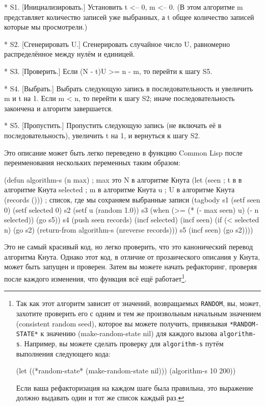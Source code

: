 \begin{myverb}
 * S1. [Инициализировать.] Установить t <-- 0, m <-- 0. (В этом алгоритме m 
представляет количество записей уже выбранных, а t общее количество 
записей которые мы просмотрели.)

 * S2. [Сгенерировать U.] Сгенерировать случайное число U, равномерно 
распределённое между нулём и единицей.

 * S3. [Проверить.] Если (N - t)U >= n - m, то перейти к шагу S5.

 * S4. [Выбрать.] Выбрать следующую запись в последовательность и увеличить
m и t на 1. Если m < n, то перейти к шагу S2; иначе 
последовательность закончена и алгоритм завершается.

 * S5. [Пропустить.] Пропустить следующую запись (не включать её в 
последовательность), увеличить t на 1, и вернуться к шагу S2.
\end{myverb}

Это описание может быть легко переведено в  функцию Common Lisp после переименования
нескольких переменных таким образом:

\begin{myverb}
(defun algorithm-s (n max) ; max это N в алгоритме Кнута
  (let (seen               ; t в в алгоритме Кнута
        selected           ; m в алгоритме Кнута
        u                  ; U в алгоритме Кнута
        (records ()))      ; список, где мы сохраняем выбранные записи
    (tagbody
     s1
       (setf seen 0)
       (setf selected 0)
     s2
       (setf u (random 1.0))
     s3
       (when (>= (* (- max seen) u) (- n selected)) (go s5))
     s4
       (push seen records)
       (incf selected)
       (incf seen)
       (if (< selected n)
           (go s2)
           (return-from algorithm-s (nreverse records)))
     s5
       (incf seen)
       (go s2))))
\end{myverb}

Это не самый красивый код, но легко проверить, что это канонический перевод алгоритма
Кнута. Однако этот код, в отличие от прозаического описания у Кнута, может быть запущен и
проверен. Затем вы можете начать рефакторинг, проверяя после каждого изменения, что
функция всё ещё работает\footnote{Так как этот алгоритм зависит от значений, возвращаемых
  \lstinline{RANDOM}, вы, может, захотите проверить его с одним и тем же произвольным
  начальным значением (consistent random seed), которое вы можете получить, привязывая
  \lstinline{*RANDOM-STATE*} к значению (make-random-state nil) для каждого вызова
  \lstinline{algorithm-s}. Например, вы можете сделать проверку для
  \lstinline{algorithm-s} путём выполнения следующего кода:

\begin{myverb}
(let ((*random-state* (make-random-state nil))) (algorithm-s 10 200))
\end{myverb}

Если ваша рефакторизация на каждом шаге была правильна, это выражение должно выдавать один
и тот же список каждый раз.}.

